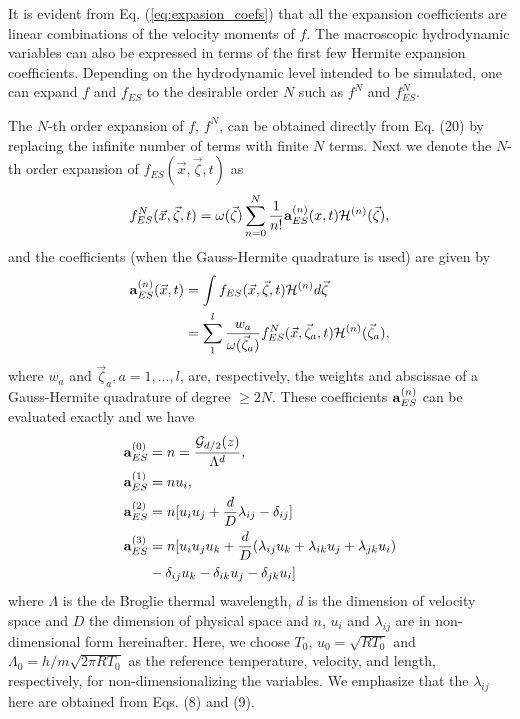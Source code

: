 \documentclass[doublecol]{epl2}
\begin{document}
It is evident from Eq. (\ref{eq:expasion_coefs}) that all the expansion coefficients are linear combinations of the velocity moments of $f$.  The macroscopic hydrodynamic variables can also be expressed in terms of the first few Hermite expansion coefficients.  Depending on the hydrodynamic level intended to be simulated, one can expand $f$ and $f_{ES}$ to the desirable order $N$ such as $f^N$ and $f_{ES}^N$.

The $N$-th order expansion of $f$, $f^N$, can be obtained directly from Eq. (20) by replacing the infinite number of terms with finite $N$ terms.  Next we denote the $N$-th order expansion of $f_{ES}(\vec x,\vec\zeta ,t)$ as
\begin{align}
 f^N_{ES}(\vec x,\vec\zeta ,t) =\omega (\vec\zeta )\sum _{n=0}^N
\frac{1}{n!} {\bf a}^{(n)}_{ES}(x,t) {{\mathcal H}}^{(n)} (\vec\zeta ),
\end{align}
and the coefficients (when the Gauss-Hermite quadrature is used) are given by
\begin{align}
{\bf a}^{(n)}_{ES} (\vec x,t) &=\int f_{ES}(\vec x,\vec\zeta ,t) {{\mathcal H}}^{(n)} d\vec\zeta \nonumber \\
&= \sum_1^l \frac{w_a}{\omega (\vec\zeta_a )} f^N_{ES}(\vec x,\vec \zeta_a ,t) {{\mathcal H}}^{(n)} (\vec\zeta_a ),
\end{align}
where $w_a$ and $\vec \zeta_a, a=1,...,l$, are, respectively, the weights and abscissae of a Gauss-Hermite quadrature of degree $ \ge 2N$.
These coefficients ${\bf a}^{(n)}_{ES}$ can be evaluated exactly and we have
\begin{subequations}
\begin{align}
{\bf a}_{ES}^{(0)} &= n = \frac{ \mathcal{G}_{d/2}(z)}{\Lambda^d}, \\
{\bf a}_{ES}^{(1)} &= n u_{i},  \\
{\bf a}_{ES}^{(2)} &= n [u_{i} u_{j} + \frac{d}{D} \lambda_{i j} - \delta_{i j}] \\
{\bf a}_{ES}^{(3)} &= n [u_{i} u_{j} u_{k} + \frac{d}{D}(\lambda_{i j} u_{k} + \lambda_{i k} u_{j} + \lambda_{j k} u_{i}) \nonumber \\																				 & - \delta_{i j} u_{k}  - \delta_{i k} u_{j}  - \delta_{j k} u_{i} ]
\end{align}
\end{subequations}
where $\Lambda$ is the de Broglie thermal wavelength, $d$ is the dimension of velocity space and $D$ the dimension of physical space and $n$, $u_{i}$ and $\lambda_{i j}$ are in non-dimensional form hereinafter. Here, we choose $T_0$, $u_0=\sqrt{ RT_0}$ and $\Lambda_0=h/m\sqrt{2\pi RT_0}$ as the reference temperature, velocity, and length, respectively, for non-dimensionalizing the variables.  We emphasize that the $\lambda_{i j}$ here are obtained from Eqs. (8) and (9).
\end{document}
